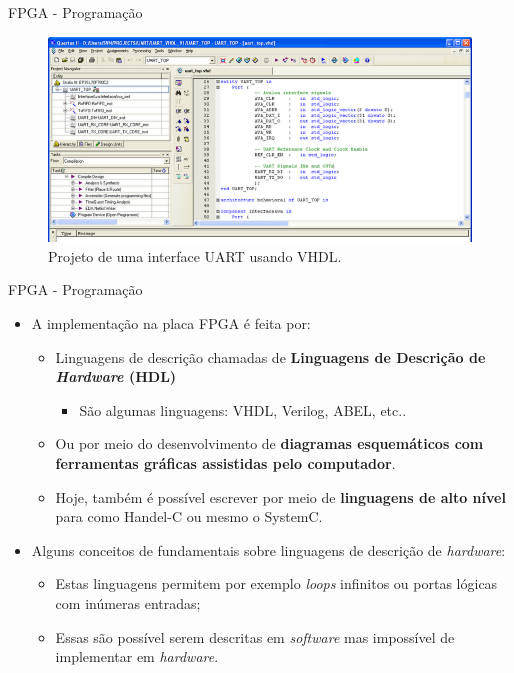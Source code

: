 \documentclass[aspectratio=169]{beamer}
\begin{document}
	\begin{frame}{FPGA - Programação}
		\begin{figure}[p]
			\centering
			\includegraphics[width=1\textwidth]{img/fpga/software_quartus_vhdl.png}
			\caption{Projeto de uma interface UART usando VHDL.}
			\label{fig:alteraquartus_vhdl-2}
		\end{figure}
	\end{frame}
	
	\begin{frame}{FPGA - Programação}
		\begin{itemize}
			\setlength\itemsep{1.0em}
			\item A implementação na placa FPGA é feita por:
			\begin{itemize}
				\setlength\itemsep{0.5em}
				\item Linguagens de descrição chamadas de \textbf{Linguagens de Descrição de \textit{Hardware} (HDL)}
				\begin{itemize}
					\item São algumas linguagens: VHDL, Verilog, ABEL, etc..
				\end{itemize}
				
				\item Ou por meio do desenvolvimento de \textbf{diagramas esquemáticos com ferramentas gráficas assistidas pelo computador}.
				
				\item Hoje, também é possível escrever por meio de \textbf{linguagens de alto nível} para como Handel-C ou mesmo o SystemC.
			\end{itemize}
			
			\item Alguns conceitos de fundamentais sobre linguagens de descrição de \textit{hardware}:
			\begin{itemize}
				\setlength\itemsep{0.5em}
				\item Estas linguagens permitem por exemplo \textit{loops} infinitos ou portas lógicas com inúmeras entradas;
				
				\item Essas são possível serem descritas em \textit{software} mas impossível de implementar em \textit{hardware}.
			\end{itemize}
		\end{itemize}
	\end{frame}
	
\end{document}
